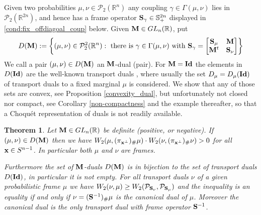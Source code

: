 \documentclass{amsart}
\numberwithin{equation}{section}
\newcommand\cP{{\mathcal P}}
\newcommand\bA{{\bf A}}
\newcommand\bM{{\bf M}}
\newcommand\bS{{\bf S}}
\newcommand\R{{\mathbb R}}
\newcommand\id{{\operatorname{\bf Id}}}
\theoremstyle{plain}
\newtheorem{theorem}[subsection]{Theorem}
\theoremstyle{definition}
\begin{document}
Given two probabilities $\mu,\nu \in \cP_2(\R^n)$ any coupling $\gamma \in \Gamma(\mu,\nu)$ lies in $\cP_2(\R^{2n})$, and hence  
has a frame operator $\bS_{\gamma} \in {\mathbb S}^{2n}_{+}$ displayed in \ref{cond:fix_offdiagoal_coup} below. 
Given $\bM \in {\rm GL}_n(\R)$, put
\begin{equation}
\label{cond:fix_offdiagoal_coup}  D(\bM):=\left\{(\mu,\nu) \in \cP^2_2(\R^n):\ \text{there is } \gamma \in \Gamma(\mu,\nu) \text{ with} \ 
{\bf S}_{\gamma}=\begin{bmatrix}
\bS_{\mu} & \bM \\
 \bM^t & \bS_{\nu}
\end{bmatrix}
\right \}
\end{equation} 
We call a pair $(\mu,\nu)\in D(\bM)$ an $\bM$-dual (pair). For  $\bM=\id$  the elements in $D(\id)$ are the well-known transport duals \cite{wickman2017duality}, 
where usually the set $D_{\mu}=D_{\mu}(\id)$ of transport duals to a fixed marginal $\mu$ is considered.  
We show that any of those sets are convex, see Proposition \ref{convexity_dual}, but unfortunately not closed nor compact, see Corollary \ref{non-compactness} and the example thereafter, so that a Choqu\'et representation of duals is not readily available. 
\begin{theorem}
Let $\bM \in {\rm GL}_n(\R)$ be definite (positive, or negative). If $(\mu,\nu) \in D(\bM)$ then we have  
$W_2(\mu, (\pi_{{\bf x}^{\perp}})_{\#}\mu)\cdot W_2(\nu, (\pi_{{\bf x}^{\perp}})_{\#}\nu) >0$   
for all ${\bf x} \in S^{n-1}$. In particular both $\mu$ and $\nu$ are frames. 

Furthermore the set of  $\bM$-duals  $D(\bM)$ is in bijection to the set of transport duals $D(\id)$, in particular it is not empty. For all transport duals $\nu$ of a given probabilistic frame $\mu$ we have $W_2(\nu, \mu) \geq  W_2(\cP_{\bS_{\nu}}, \cP_{\bS_{\mu}})$ 
and the inequality is an equality if and only if $\nu=(\bS^{-1})_{\#}\mu$ is the canonical dual of $\mu$. Moreover the canonical 
dual is the only transport dual with frame operator $\bS^{-1}$.   
\end{theorem}
\end{document}
